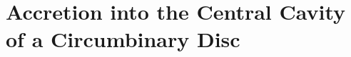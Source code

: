 \chapter[Accretion into the Central Cavity]{Accretion into the Central Cavity of a Circumbinary Disc}
\label{ch:BinAcc}


%
%













  
  
%



